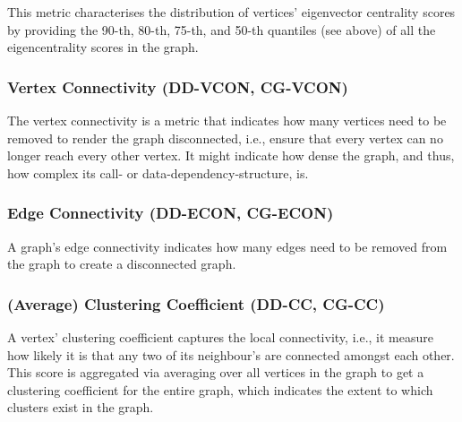 This metric characterises the distribution of vertices' eigenvector centrality
scores by providing the 90-th, 80-th, 75-th, and 50-th quantiles (see above) of
all the eigencentrality scores in the graph.

\subsubsection{Vertex Connectivity (DD-VCON, CG-VCON)}

The vertex connectivity is a metric that indicates how many vertices need to be
removed to render the graph disconnected, i.e., ensure that every vertex can no
longer reach every other vertex. It might indicate how dense the graph, and
thus, how complex its call- or data-dependency-structure, is.

\subsubsection{Edge Connectivity (DD-ECON, CG-ECON)}

A graph's edge connectivity indicates how many edges need to be removed from the
graph to create a disconnected graph.

\subsubsection{(Average) Clustering Coefficient (DD-CC, CG-CC)}

A vertex' clustering coefficient captures the local connectivity, i.e., it
measure how likely it is that any two of its neighbour's are connected amongst
each other. This score is aggregated via averaging over all vertices in the
graph to get a clustering coefficient for the entire graph, which indicates the
extent to which clusters exist in the graph.